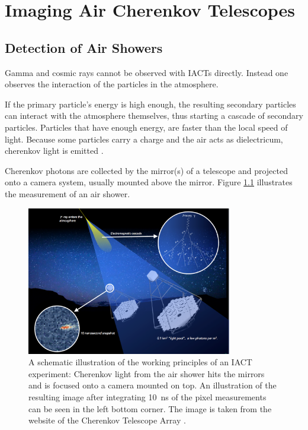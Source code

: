 \chapter{Imaging Air Cherenkov Telescopes}
\label{cta}


\section{Detection of Air Showers}
\label{sec:measuring}

Gamma and cosmic rays cannot be 
observed with IACTs directly. Instead one observes the interaction of
the particles in the atmosphere.

If the primary particle's energy is high enough, the resulting 
secondary particles can interact with the atmosphere themselves, thus starting a 
cascade of secondary particles.
Particles that have enough energy, are faster than the local speed of light.
Because some particles carry a charge and the air acts as dielectricum, 
cherenkov light is emitted \cite{WATSON201113}.

Cherenkov photons are collected by the mirror(s) of a telescope
and projected onto a camera system, usually mounted above the mirror.
Figure \ref{fig:iact_mirror_camera} illustrates the measurement of 
an air shower.

\begin{figure}
	\centering
	\captionsetup{width=0.9\linewidth}
	\includegraphics[width=0.8\textwidth]{images/cta47.png}
	\caption{A schematic illustration of the working principles of 
	an IACT experiment:
	Cherenkov light from the air shower 
	hits the mirrors and is focused onto a camera mounted on top.
	An illustration of the resulting image after integrating 
	\SI{10}{\nano\second} of the pixel measurements
	can be seen in the left bottom corner.
	The image is taken from the website 
	of the Cherenkov Telescope Array \cite{cta_web}.}
	\label{fig:iact_mirror_camera}
\end{figure}

